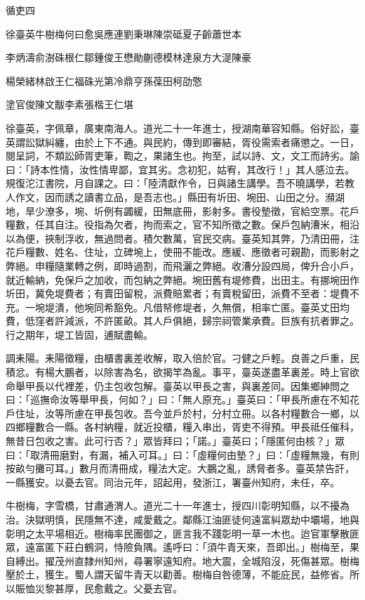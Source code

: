 
\begin{pinyinscope}
循吏四

徐臺英牛樹梅何曰愈吳應連劉秉琳陳崇砥夏子齡蕭世本

李炳濤俞澍硃根仁鄒鍾俊王懋勛蒯德模林達泉方大湜陳豪

楊榮緒林啟王仁福硃光第冷鼎亨孫葆田柯劭憼

塗官俊陳文黻李素張楷王仁堪

徐臺英，字佩章，廣東南海人。道光二十一年進士，授湖南華容知縣。俗好訟，臺英謂訟獄糾纏，由於上下不通。與民約，傳到即審結，胥役需索者痛懲之。一日，閱呈詞，不類訟師胥吏筆，鞫之，果諸生也。拘至，試以詩、文，文工而詩劣。諭曰：「詩本性情，汝性情卑鄙，宜其劣。念初犯，姑宥，其改行！」其人感泣去。規復沱江書院，月自課之。曰：「陸清獻作令，日與諸生講學。吾不曉講學，若教人作文，因而誘之讀書立品，是吾志也。」縣田有圻田、埦田、山田之分。瀕湖地，旱少潦多，埦、圻例有蠲緩，田無底冊，影射多。書役墊徵，官給空票。花戶糧數，任其自注。役指為欠者，拘而索之，官不知所徵之數。保戶包納漕米，相沿以為便，挾制浮收，無過問者。積欠數萬，官民交病。臺英知其弊，乃清田冊，注花戶糧數、姓名、住址，立碑埦上，使冊不能改。應緩、應徵者可親勘，而影射之弊絕。申糧隨業轉之例，即時過割，而飛灑之弊絕。收漕分設四局，俾升合小戶，就近輸納，免保戶之加收，而包納之弊絕。埦田舊有堤修費，出田主。有挪埦田作圻田，冀免堤費者；有賣田留稅，派費賠累者；有賣稅留田，派費不至者：堤費不充。一埦堤潰，他埦同希豁免。凡借帑修堤者，久無償，相率亡匿。臺英丈田均費，低窪者許減派，不許匿畝。其人戶俱絕，歸宗祠管業承費。巨族有抗者罪之。行之期年，堤工皆固，逋賦盡輸。

調耒陽。耒陽徵糧，由櫃書裏差收解，取入倍於官。刁健之戶輕。良善之戶重，民積忿。有楊大鵬者，以除害為名，欲揭竿為亂。事平，臺英遂盡革裏差。時上官欲命舉甲長以代裡差，仍主包收包解。臺英以甲長之害，與裏差同。因集鄉紳問之曰：「巡撫命汝等舉甲長，何如？」曰：「無人原充。」臺英曰：「甲長所慮在不知花戶住址，汝等所慮在甲長包收。吾今並戶於村，分村立冊。以各村糧數合一鄉，以四鄉糧數合一縣。各村納糧，就近投櫃，糧入串出，胥吏不得預。甲長祗任催科，無昔日包收之害。此可行否？」眾皆拜曰；「諾。」臺英曰；「隱匿何由核？」眾曰：「取清冊磨對，有漏，補入可耳。」曰：「虛糧何由墊？」曰：「虛糧無幾，有則按畝勻攤可耳。」數月而清冊成，糧法大定。大鵬之亂，誘脅者多。臺英禁告訐，一縣獲安。以憂去官。同治元年，詔起用，發浙江，署臺州知府，未任，卒。

牛樹梅，字雪橋，甘肅通渭人。道光二十一年進士，授四川彰明知縣，以不擾為治。決獄明慎，民隱無不達，咸愛戴之。鄰縣江油匪徒何遠富糾眾劫中壩場，地與彰明之太平場相近。樹梅率民團御之，匪言我不踐彰明一草一木也。迨官軍擊散匪眾，遠富匿下莊白鶴洞，恃險負隅。遙呼曰：「須牛青天來，吾即出。」樹梅至，果自縛出。擢茂州直隸州知州，尋署寧遠知府。地大震，全城陷沒，死傷甚眾。樹梅壓於土，獲生。蜀人謂天留牛青天以勸善。樹梅自咎德薄，不能庇民，益修省。所以賑恤災黎甚厚，民愈戴之。父憂去官。


\end{pinyinscope}
